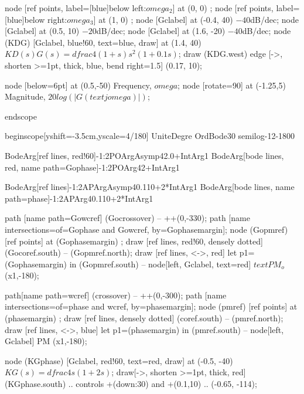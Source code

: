 node [ref points, label={[blue]below left:$omega_2$}] at (0, 0) {};
node [ref points, label={[blue]below right:$omega_3$}] at (1, 0) {};
node [Gclabel] at (-0.4, 40) {$-40$dB/dec};
node [Gclabel] at (0.5, 10) {$-20$dB/dec};
node [Gclabel] at (1.6, -20) {$-40$dB/dec};
node (KDG) [Gclabel, blue!60, text=blue, draw] 
    at (1.4, 40) {$KD(s)G(s)=dfrac{4(1+s)}{s^2(1+0.1s)}$};
draw (KDG.west) edge [->, shorten >=1pt, thick, blue, bend right=1.5] 
    (0.17, 10);

node [below=6pt] at (0.5,-50) {Frequency, $omega$};
node [rotate=90] at (-1.25,5) {Magnitude, $20log(|G(text{j}omega)|)$};


end{scope}

begin{scope}[yshift=-3.5cm,yscale=4/180]
UniteDegre
OrdBode{30}
semilog{-1}{2}{-180}{0}

BodeArg[ref lines, red!60]{-1:2}{POArgAsymp{4}{2.0}+IntArg{1}}
BodeArg[bode lines, red, name path=Gophase]{-1:2}{POArg{4}{2}+IntArg{1}}

BodeArg[ref lines]{-1:2}{APArgAsymp{4}{0.1}{10}+2*IntArg{1}}
BodeArg[bode lines, name path=phase]{-1:2}{APArg{4}{0.1}{10}+2*IntArg{1}}

path [name path=Gowcref] (Gocrossover) -- ++(0,-330);
path [name intersections={of=Gophase and Gowcref, by=Gophasemargin}];
node (Gopmref) [ref points] at (Gophasemargin) {};
draw [ref lines, red!60, densely dotted] (Gocoref.south) -- (Gopmref.north);
draw [ref lines, <->, red] let p1=(Gophasemargin)
    in
        (Gopmref.south) -- node[left, Gclabel, text=red] {$text{PM}_o$} (x1,-180);

path[name path=wcref] (crossover) -- ++(0,-300);
path [name intersections={of=phase and wcref, by=phasemargin}];
node (pmref) [ref points] at (phasemargin) {};
draw [ref lines, densely dotted] (coref.south) -- (pmref.north);
draw [ref lines, <->, blue] let p1=(phasemargin)
    in
        (pmref.south) -- node[left, Gclabel] {PM} (x1,-180);

node (KGphase) [Gclabel, red!60, text=red, draw] 
    at (-0.5, -40) {$KG(s)=dfrac{4}{s(1+2s)}$};
draw[->, shorten >=1pt, thick, red] 
    (KGphase.south) .. controls +(down:30) and +(0.1,10) .. (-0.65, -114);

